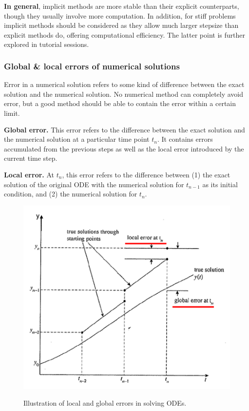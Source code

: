 \documentclass[a4paper,11pt]{article}
\theoremstyle{definition}
\begin{document}
\textbf{In general}, implicit methods are more stable than their explicit counterparts, though they
usually involve more computation. In addition, for stiff problems implicit methods should be considered
as they allow much larger stepsize than explicit methods do, offering computational efficiency.
The latter point is further explored in tutorial sessions.

\subsubsection*{Global \& local errors of numerical solutions}

Error in a numerical solution refers to some kind of difference between the exact
solution and the numerical solution. No numerical method can completely avoid
error, but a good method should be able to contain the error within a certain limit.

\textbf{Global error.} This error refers to the difference between the exact solution and 
the numerical solution at a particular time point $t_n$. It contains errors accumulated from the previous steps 
as well as the local error introduced by the current time step.

\textbf{Local error.} At $t_n$, this error refers to the difference between 
(1) the exact solution of the original ODE with the numerical solution for $t_{n-1}$ as its initial condition, 
and (2) the numerical solution for $t_n$.

\begin{figure} [!h]
 \begin{center}
	\includegraphics[width=.6\textwidth]{error}\\
 \end{center}
 \caption{Illustration of local and global errors in solving ODEs.} 
 \label{fig:error}
\end{figure}
\end{document}
